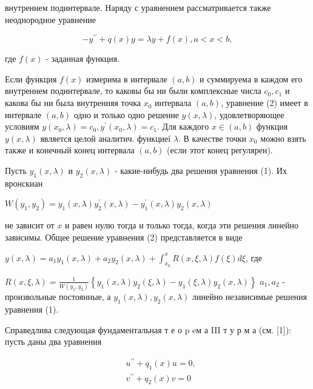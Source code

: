 \documentclass[10pt]{article}
\begin{document}
внутреннем подинтервале. Наряду с уравнением рассматривается также неоднородное уравнение



\[

-y^{\prime \prime}+q(x) y=\lambda y+f(x), a<x<b,

\]



где $f(x)$ - заданная функция.



Если функция $f(x)$ измерима в интервале $(a, b)$ и суммируема в каждом его внутреннем подинтервале, то каковы бы ни были комплексные числа $c_{0}, c_{1}$ и какова бы ни была внутренняя точка $x_{0}$ интервала $(a, b)$, уравнение (2) имеет в интервале $(a, b)$ одно и только одно решение $y(x, \lambda)$, удовлетворяющее условиям $y\left(x_{0}, \lambda\right)=c_{0}, y^{\prime}\left(x_{0}, \lambda\right)=c_{1}$. Для каждого $x \in(a, b)$ функция $y(x, \lambda)$ является целой аналитич. функциеї $\lambda$. В качестве точки $x_{0}$ можно взять также и конечный конец интервала $(a, b)$ (если этот конец регулярен).



Пусть $y_{1}(x, \lambda)$ и $y_{2}(x, \lambda)$ - какие-нибудь два решения уравнения (1). Их вронскиан



$W\left(y_{1}, y_{2}\right)=y_{1}(x, \lambda) y_{2}^{\prime}(x, \lambda)-y_{1}^{\prime}(x, \lambda) y_{2}(x, \lambda)$



не зависит от $x$ и равен нулю тогда и только тогда, когда эти решения линейно зависимы. Общее решение уравнения (2) представляется в виде



$y(x, \lambda)=a_{1} y_{1}(x, \lambda)+a_{2} y_{2}(x, \lambda)+\int_{x_{0}}^{x} R(x, \xi, \lambda) f(\xi) d \xi$, где



$R(x, \xi, \lambda)=\frac{1}{W\left(y_{1}, y_{2}\right)}\left\{y_{1}(x, \lambda) y_{2}(\xi, \lambda)-y_{1}(\xi, \lambda) y_{2}(x, \lambda)\right\}$ $a_{1}, a_{2}$ - произвольные постоянные, а $y_{1}(x, \lambda), y_{2}(x, \lambda)$ линейно независимые решения уравнения (1).



Справедлива следующая фундаментальная т е о p eм а III т у р м а (см. [1]): пусть даны два уравнения



\[

\begin{aligned}

& u^{\prime \prime}+q_{1}(x) u=0, \\

& v^{\prime \prime}+q_{2}(x) v=0

\end{aligned}

\]
\end{document}
